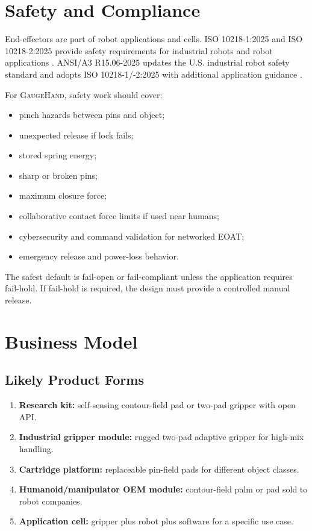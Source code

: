 \documentclass[11pt]{article}
\newcommand{\GaugeHand}{\textsc{GaugeHand}}
\begin{document}
\section{Safety and Compliance}

End-effectors are part of robot applications and cells. ISO 10218-1:2025 and ISO 10218-2:2025 provide safety requirements for industrial robots and robot applications \cite{iso10218_1_2025,iso10218_2_2025}. ANSI/A3 R15.06-2025 updates the U.S. industrial robot safety standard and adopts ISO 10218-1/-2:2025 with additional application guidance \cite{a3_r1506_2025}.

For \GaugeHand{}, safety work should cover:

\begin{itemize}[leftmargin=*]
  \item pinch hazards between pins and object;
  \item unexpected release if lock fails;
  \item stored spring energy;
  \item sharp or broken pins;
  \item maximum closure force;
  \item collaborative contact force limits if used near humans;
  \item cybersecurity and command validation for networked EOAT;
  \item emergency release and power-loss behavior.
\end{itemize}

The safest default is fail-open or fail-compliant unless the application requires fail-hold. If fail-hold is required, the design must provide a controlled manual release.

\section{Business Model}

\subsection{Likely Product Forms}

\begin{enumerate}[leftmargin=*]
  \item \textbf{Research kit:} self-sensing contour-field pad or two-pad gripper with open API.
  \item \textbf{Industrial gripper module:} rugged two-pad adaptive gripper for high-mix handling.
  \item \textbf{Cartridge platform:} replaceable pin-field pads for different object classes.
  \item \textbf{Humanoid/manipulator OEM module:} contour-field palm or pad sold to robot companies.
  \item \textbf{Application cell:} gripper plus robot plus software for a specific use case.
\end{enumerate}
\end{document}
